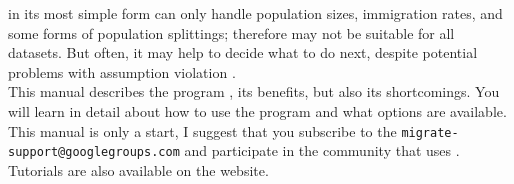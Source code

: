 \migrate in its most simple form can only handle population sizes, immigration rates, and some forms of population splittings; therefore may not be suitable for all datasets. But often, it may help to decide what to do next, despite potential problems with assumption violation \citep{beerli:2009:wid}. \\
This manual describes the program \migrate, its benefits, but also its shortcomings. You will learn in detail about how to use the program and what options are available. This manual is only a start, I suggest that you subscribe to the \texttt{migrate-support@googlegroups.com} and participate in the community that uses \migrate. Tutorials are also available on the \migrate website.